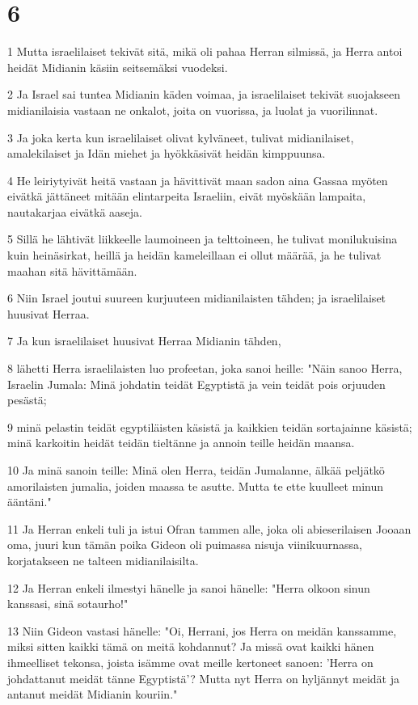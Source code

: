 \chapter{6}

\par 1 Mutta israelilaiset tekivät sitä, mikä oli pahaa Herran silmissä, ja Herra antoi heidät Midianin käsiin seitsemäksi vuodeksi.
\par 2 Ja Israel sai tuntea Midianin käden voimaa, ja israelilaiset tekivät suojakseen midianilaisia vastaan ne onkalot, joita on vuorissa, ja luolat ja vuorilinnat.
\par 3 Ja joka kerta kun israelilaiset olivat kylväneet, tulivat midianilaiset, amalekilaiset ja Idän miehet ja hyökkäsivät heidän kimppuunsa.
\par 4 He leiriytyivät heitä vastaan ja hävittivät maan sadon aina Gassaa myöten eivätkä jättäneet mitään elintarpeita Israeliin, eivät myöskään lampaita, nautakarjaa eivätkä aaseja.
\par 5 Sillä he lähtivät liikkeelle laumoineen ja telttoineen, he tulivat monilukuisina kuin heinäsirkat, heillä ja heidän kameleillaan ei ollut määrää, ja he tulivat maahan sitä hävittämään.
\par 6 Niin Israel joutui suureen kurjuuteen midianilaisten tähden; ja israelilaiset huusivat Herraa.
\par 7 Ja kun israelilaiset huusivat Herraa Midianin tähden,
\par 8 lähetti Herra israelilaisten luo profeetan, joka sanoi heille: "Näin sanoo Herra, Israelin Jumala: Minä johdatin teidät Egyptistä ja vein teidät pois orjuuden pesästä;
\par 9 minä pelastin teidät egyptiläisten käsistä ja kaikkien teidän sortajainne käsistä; minä karkoitin heidät teidän tieltänne ja annoin teille heidän maansa.
\par 10 Ja minä sanoin teille: Minä olen Herra, teidän Jumalanne, älkää peljätkö amorilaisten jumalia, joiden maassa te asutte. Mutta te ette kuulleet minun ääntäni."
\par 11 Ja Herran enkeli tuli ja istui Ofran tammen alle, joka oli abieserilaisen Jooaan oma, juuri kun tämän poika Gideon oli puimassa nisuja viinikuurnassa, korjatakseen ne talteen midianilaisilta.
\par 12 Ja Herran enkeli ilmestyi hänelle ja sanoi hänelle: "Herra olkoon sinun kanssasi, sinä sotaurho!"
\par 13 Niin Gideon vastasi hänelle: "Oi, Herrani, jos Herra on meidän kanssamme, miksi sitten kaikki tämä on meitä kohdannut? Ja missä ovat kaikki hänen ihmeelliset tekonsa, joista isämme ovat meille kertoneet sanoen: 'Herra on johdattanut meidät tänne Egyptistä'? Mutta nyt Herra on hyljännyt meidät ja antanut meidät Midianin kouriin."
